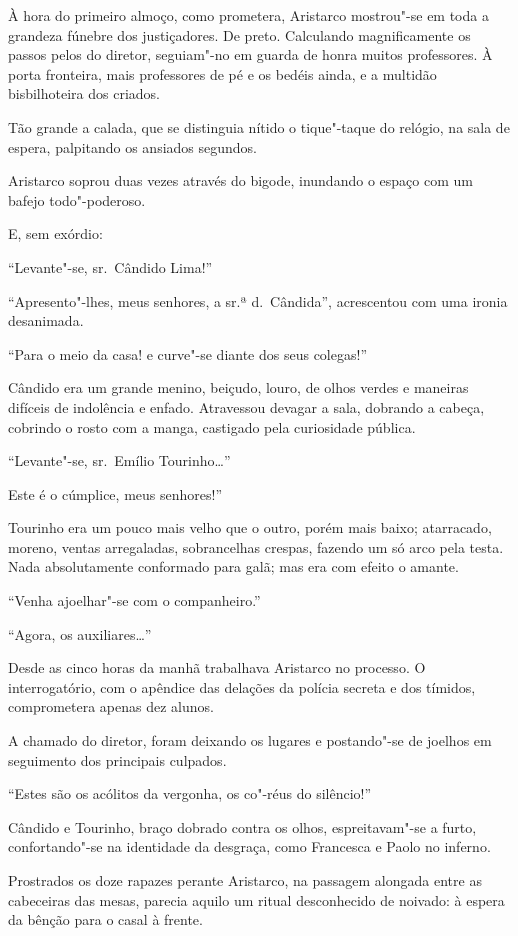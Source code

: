 À hora do primeiro almoço, como
prometera, Aristarco mostrou"-se em toda a grandeza fúnebre dos
justiçadores. De preto. Calculando magnificamente os passos pelos do
diretor, seguiam"-no em guarda de honra muitos professores. À porta
fronteira, mais professores de pé e os bedéis ainda, e a multidão
bisbilhoteira dos criados. 

Tão grande a calada, que se distinguia
nítido o tique"-taque do relógio, na sala de espera, palpitando os
ansiados segundos. 

Aristarco soprou duas vezes através do bigode,
inundando o espaço com um bafejo todo"-poderoso. 

E, sem exórdio:

``Levante"-se, sr.~Cândido Lima!'' 

``Apresento"-lhes, meus senhores, a
sr.ª d.~Cândida'', acrescentou com uma ironia desanimada. 

``Para o meio da casa! e curve"-se diante dos seus colegas!'' 

Cândido era um grande
menino, beiçudo, louro, de olhos verdes e maneiras difíceis de
indolência e enfado. Atravessou devagar a sala, dobrando a cabeça,
cobrindo o rosto com a manga, castigado pela curiosidade pública.

``Levante"-se, sr.~Emílio Tourinho\ldots{}'' 

Este é o cúmplice, meus senhores!'' 

Tourinho era um pouco mais velho que o outro, porém mais
baixo; atarracado, moreno, ventas arregaladas, sobrancelhas crespas,
fazendo um só arco pela testa. Nada absolutamente conformado para galã;
mas era com efeito o amante. 

``Venha ajoelhar"-se com o companheiro.''

``Agora, os auxiliares\ldots{}'' 

Desde as cinco horas da manhã trabalhava
Aristarco no processo. O interrogatório, com o apêndice das delações da
polícia secreta e dos tímidos, comprometera apenas dez alunos. 

A chamado do diretor, foram deixando os lugares e postando"-se de
joelhos em seguimento dos principais culpados. 

``Estes são os acólitos da vergonha, os co"-réus do silêncio!'' 

Cândido e Tourinho, braço
dobrado contra os olhos, espreitavam"-se a furto, confortando"-se na
identidade da desgraça, como Francesca e Paolo no inferno. 

Prostrados os doze rapazes perante Aristarco, na passagem alongada entre as
cabeceiras das mesas, parecia aquilo um ritual desconhecido de noivado:
à espera da bênção para o casal à frente. 

